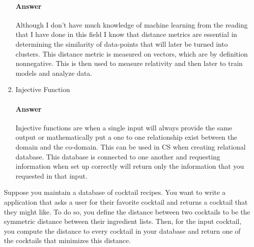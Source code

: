\documentclass{article}
\begin{document}
\begin{enumerate}
        \paragraph{Answer}

        Although I don't have much knowledge of machine learning from the reading that I have done
        in this field I know that distance metrics are essential in determining the similarity of data-points
        that will later be turned into clusters. This distance metric is measured on vectors, which are by definition
        nonnegative. This is then used to measure relativity and then later to train models and analyze data.

    \item Injective Function

        \paragraph{Answer}

        Injective functions are when a single input will always provide the same output or mathematically
        put a one to one relationship exist between the domain and the co-domain. This can be used in
        CS when creating relational database. This database is connected to one another and requesting information
        when set up correctly will return only the information that you requested in that input.



\end{enumerate}


\collab{\todo{}} 

Suppose you maintain a database of cocktail recipes.  You want to write a
application that asks a user for their favorite cocktail and returns a cocktail
that they might like.  To do so, you define the distance between two cocktails
to be the symmetric distance between their ingredient lists.  Then, for the
input cocktail, you compute the distance to every cocktail in your database and
return one of the cocktails that minimizes this distance.
\end{document}

